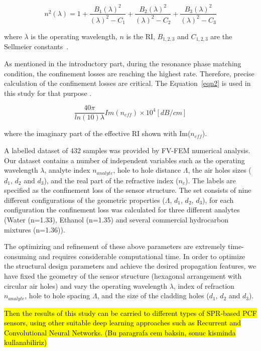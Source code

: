 \documentclass[10pt]{IEEEtran}
\begin{document}
\begin{equation}
n^2(\lambda)=1+\frac{ B_1 (\lambda)^2} {(\lambda)^2-C_1} + \frac{ B_2 (\lambda)^2} {(\lambda)^2-C_2} + \frac{ B_3 (\lambda)^2} {(\lambda)^2-C_3}
\label{eqn1}
\end{equation}

where $\lambda$ is the operating wavelength, $n$ is the RI, $B_{1,2,3}$ and  $C_{1,2,3}$ are the  Sellmeier constants~\cite{bjarklev2003PCF}.

As mentioned in the introductory part, during the resonance phase matching condition, the confinement losses are reaching the highest rate. Therefore, precise calculation of the confinement losses are critical.  The Equation~\ref{eqn2} is used in this study for that purpose \cite{yasli2019effect}.



\begin{equation}
\frac{40\pi}{ln(10) \lambda} Im(n_{eff}) \times 10^{4} [dB/cm]
\label{eqn2}
\end{equation}

where the imaginary part of the effective RI shown with Im($n_{eff}$).

A labelled dataset of 432 samples was provided by FV-FEM numerical analysis. Our dataset contains a number of independent variables such as the operating wavelength $\lambda$, analyte index $n_{analyte}$, hole to hole distance $\Lambda$, the air holes sizes ($d_1$, $d_2$ and $d_3$), and the real part of the refractive index ($n_c$). The labels are specified as the confinement loss of the sensor structure. The set consists of nine different configurations of the geometric properties ($\Lambda$, $d_1$, $d_2$, $d_3$), for each configuration the confinement loss was calculated for three different analytes (Water (n=1.33), Ethanol (n=1.35) and several commercial hydrocarbon mixtures (n=1.36)).

The optimizing and refinement of these above parameters are extremely time-consuming and requires considerable computational time. In order to optimize the structural design parameters and achieve the desired propagation features, we have fixed the geometry of the sensor structure (hexagonal arrangement with circular air holes) and vary the operating wavelength $\lambda$, index of refraction $n_{analyte}$, hole to hole spacing $\Lambda$, and the size of the cladding holes ($d_1$, $d_2$ and $d_3$).
 
\hl {Then the results of this study can be carried to different types of SPR-based PCF sensors, using other suitable deep learning approaches such as Recurrent and Convolutional Neural Networks. (Bu paragrafa cem baksin, sonuc kisminda kullanabiliriz)}
\end{document}
